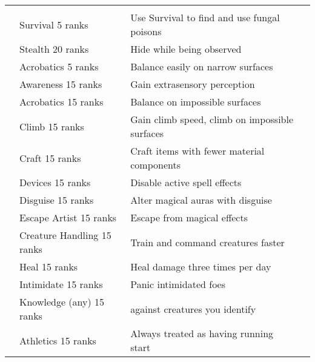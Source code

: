 \begin{longtabuwrapper}
\begin{longtabu}{>{\lcol}p{10em} >{\lcol}p{15em} >{\lcol}X >{\lcol}p{3em}}
        \midrule
         &  &  &  \\
         & Survival 5 ranks & Use Survival to find and use fungal poisons &  \\
         & Stealth 20 ranks & Hide while being observed &  \\
         & Acrobatics 5 ranks & Balance easily on narrow surfaces &  \\
         & Awareness 15 ranks & Gain extrasensory perception &  \\
         & Acrobatics 15 ranks & Balance on impossible surfaces &  \\
         & Climb 15 ranks & Gain climb speed, climb on impossible surfaces &  \\
         & Craft 15 ranks & Craft items with fewer material components &  \\
         & Devices 15 ranks & Disable active spell effects &  \\
         & Disguise 15 ranks & Alter magical auras with disguise &  \\
         & Escape Artist 15 ranks & Escape from magical effects &  \\
         & Creature Handling 15 ranks & Train and command creatures faster &  \\
         & Heal 15 ranks & Heal damage three times per day &  \\
         & Intimidate 15 ranks & Panic intimidated foes &  \\
         & Knowledge (any) 15 ranks &  against creatures you identify &  \\
         & Athletics 15 ranks & Always treated as having running start &  \\

\end{longtabu}
\end{longtabuwrapper}
